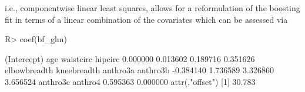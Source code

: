 \documentclass{article}
\newenvironment{Schunk}{}{}
\begin{document}
i.e., componentwise linear least squares, 
allows for a reformulation of the boosting fit in terms of a linear combination
of the covariates which can be assessed via
\begin{Schunk}
\begin{Sinput}
R> coef(bf_glm)
\end{Sinput}
\begin{Soutput}
 (Intercept)          age    waistcirc      hipcirc 
    0.000000     0.013602     0.189716     0.351626 
elbowbreadth  kneebreadth     anthro3a     anthro3b 
   -0.384140     1.736589     3.326860     3.656524 
    anthro3c      anthro4 
    0.595363     0.000000 
attr(,"offset")
[1] 30.783
\end{Soutput}
\end{Schunk}

\end{document}
